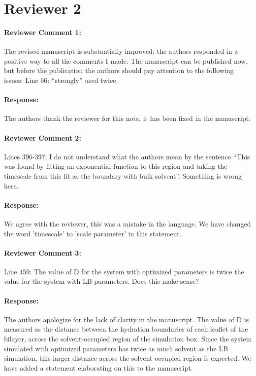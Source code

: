 \documentclass{article}
\begin{document}
\section*{Reviewer 2}
\paragraph{Reviewer Comment 1:}
The revised manuscript is substantially improved;  the authors responded 
in a positive way to all the comments I made.  
The manuscript can be published now, but before the publication the 
authors should pay attention to the following issues:
Line 66: “strongly” used twice.
\paragraph{Response:}
The authors thank the reviewer for this note, it has been fixed in the manuscript.
\paragraph{Reviewer Comment 2:}
Lines 396-397: I do not understand what the authors mean by the sentence 
“This was found by fitting an exponential function to this region and taking the timescale 
from this fit as the boundary with bulk solvent”.  Something is wrong here.
\paragraph{Response:}
We agree with the reviewer, this was a mistake in the language. We have changed the word 'timescale' to 
'scale parameter' in this statement.
\paragraph{Reviewer Comment 3:}
Line 459: The value of D for the system with optimized parameters is twice 
the value for the system with LB parameters.  Does this make sense?
\paragraph{Response:}
The authors apologize for the lack of clarity in the manuscript. The value of D is measured as the distance
between the hydration boundaries of each leaflet of the bilayer, across the solvent-occupied region of the
simulation box. Since the system simulated with optimized parameters has twice as much solvent as the LB simulation, 
this larger distance across the solvent-occupied region is expected. We have added a statement elaborating on
this to the manuscript.
\end{document}
